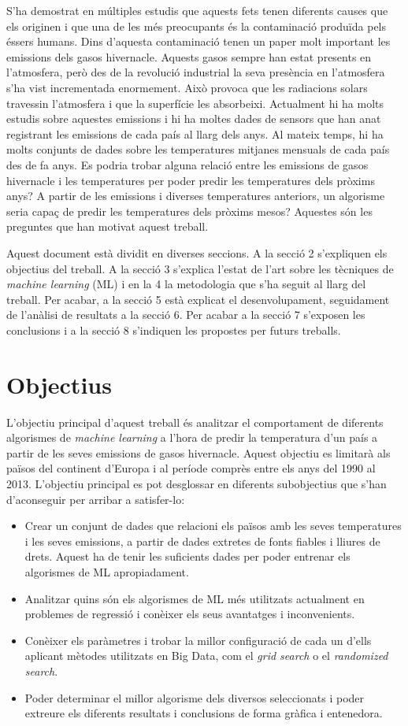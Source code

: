 \documentclass[10pt,a4paper,twocolumn,twoside]{article}
\begin{document}
S'ha demostrat en múltiples estudis que aquests fets tenen diferents causes que els originen i que una de les més preocupants és la contaminació produïda pels éssers humans. Dins d'aquesta contaminació tenen un paper molt important les emissions dels gasos hivernacle. Aquests gasos sempre han estat presents en l'atmosfera, però des de la revolució industrial la seva presència en l'atmosfera s'ha vist incrementada enormement. Això provoca que les radiacions solars travessin l'atmosfera i que la superfície les absorbeixi. Actualment hi ha molts estudis sobre aquestes emissions i hi ha moltes dades de sensors que han anat registrant les emissions de cada país al llarg dels anys. Al mateix temps, hi ha molts conjunts de dades sobre les temperatures mitjanes mensuals de cada país des de fa anys. Es podria trobar alguna relació entre les emissions de gasos hivernacle i les temperatures per poder predir les temperatures dels pròxims anys? A partir de les emissions i diverses temperatures anteriors, un algorisme seria capaç de predir les temperatures dels pròxims mesos? Aquestes són les preguntes que han motivat aquest treball.

Aquest document està dividit en diverses seccions. A la secció 2 s'expliquen els objectius del treball. A la  secció 3 s'explica l'estat de l'art sobre les tècniques de \textit{machine learning} (ML) i en la 4 la metodologia que s'ha seguit al llarg del treball. Per acabar, a la secció 5 està explicat el desenvolupament, seguidament de l'anàlisi de resultats a la secció 6. Per acabar a la secció 7 s'exposen les conclusions i a la secció 8 s'indiquen les propostes per futurs treballs.   
\section{Objectius}
L'objectiu principal d'aquest treball és analitzar el comportament de diferents algorismes de \textit{machine learning} a l'hora de predir la temperatura d'un país a partir de les seves emissions de gasos hivernacle. Aquest objectiu es limitarà als països del continent d'Europa i al període comprès entre els anys del 1990 al 2013. L'objectiu principal es pot desglossar en diferents subobjectius que s'han d'aconseguir per arribar a satisfer-lo:
\begin{itemize}
\item Crear un conjunt de dades que relacioni els països amb les seves temperatures i les seves emissions, a partir de dades extretes de fonts fiables i lliures de drets. Aquest ha de tenir les suficients dades per poder entrenar els algorismes de ML apropiadament.
\item Analitzar quins són els algorismes de ML més utilitzats actualment en problemes de regressió i conèixer els seus avantatges i inconvenients.
\item Conèixer els paràmetres i trobar la millor configuració de cada un d'ells aplicant mètodes utilitzats en Big Data, com el \textit{grid search} o el \textit{randomized search}.
\item Poder determinar el millor algorisme dels diversos seleccionats i poder extreure els diferents resultats i conclusions de forma gràfica i entenedora.  
\end{itemize}
\end{document}
